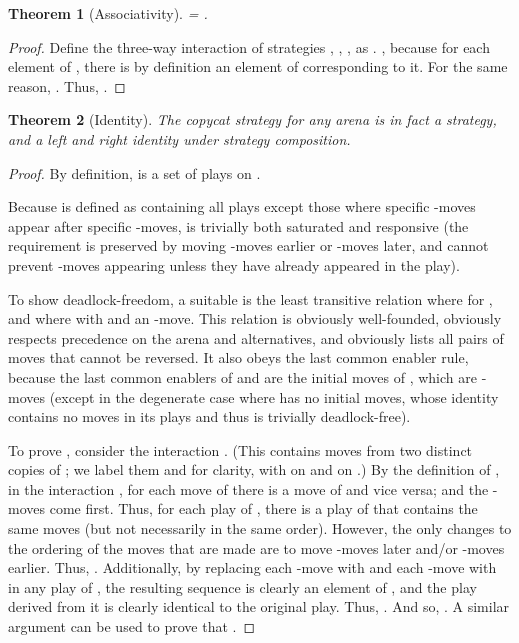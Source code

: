 \documentclass{article}
\newtheorem{theorem}{Theorem}
\begin{document}
\begin{theorem}[Associativity]
   = .
\end{theorem}
\begin{proof}
  Define the three-way interaction  of
strategies , , , as .
,
because for each element of , there is by definition an
element of  corresponding to it. For the same reason,
.
Thus, .
\end{proof}


\begin{theorem}[Identity]
  The copycat strategy  for any arena  is in fact a strategy, and a left and right identity under strategy composition.
\end{theorem}
\begin{proof}
  By definition,  is a set of plays on .

  Because  is defined as containing all plays except those where specific -moves appear after specific -moves,  is trivially both saturated and responsive (the requirement is preserved by moving -moves earlier or -moves later, and cannot prevent -moves appearing unless they have already appeared in the play).

  To show deadlock-freedom, a suitable  is the least transitive relation where  for , and where  with  and  an -move. This relation is obviously well-founded, obviously respects precedence on the arena and alternatives, and obviously lists all pairs of moves that cannot be reversed. It also obeys the last common enabler rule, because the last common enablers of  and  are the initial moves of , which are -moves (except in the degenerate case where  has no initial moves, whose identity contains no moves in its plays and thus is trivially deadlock-free).

  To prove , consider the interaction . (This contains moves from two distinct copies of ; we label them  and  for clarity, with  on  and  on .) By the definition of , in the interaction , for each move of  there is a move of  and vice versa; and the -moves come first. Thus, for each play of , there is a play of  that contains the same moves (but not necessarily in the same order). However, the only changes to the ordering of the moves that are made are to move -moves later and/or -moves earlier. Thus, . Additionally, by replacing each -move  with  and each -move  with  in any play of , the resulting sequence is clearly an element of , and the play derived from it is clearly identical to the original play. Thus, . And so, . A similar argument can be used to prove that .
\end{proof}
\end{document}
